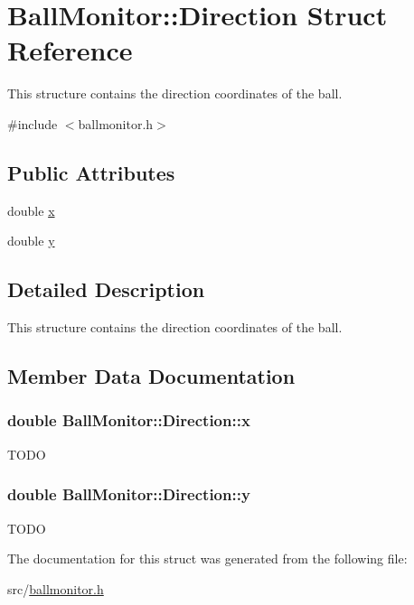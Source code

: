 \hypertarget{structBallMonitor_1_1Direction}{
\section{BallMonitor::Direction Struct Reference}
\label{structBallMonitor_1_1Direction}
}


This structure contains the direction coordinates of the ball.  




{\ttfamily \#include $<$ballmonitor.h$>$}

\subsection*{Public Attributes}
\begin{DoxyCompactItemize}
\item 
double \hyperlink{structBallMonitor_1_1Direction_aa0bde9b600685b464f05bf098857e4ce}{x}
\item 
double \hyperlink{structBallMonitor_1_1Direction_a1228146c1a63d672e59b1e5df760bf68}{y}
\end{DoxyCompactItemize}


\subsection{Detailed Description}
This structure contains the direction coordinates of the ball. 

\subsection{Member Data Documentation}
\hypertarget{structBallMonitor_1_1Direction_aa0bde9b600685b464f05bf098857e4ce}{
\subsubsection[{x}]{\setlength{\rightskip}{0pt plus 5cm}double {\bf BallMonitor::Direction::x}}}
\label{structBallMonitor_1_1Direction_aa0bde9b600685b464f05bf098857e4ce}
TODO \hypertarget{structBallMonitor_1_1Direction_a1228146c1a63d672e59b1e5df760bf68}{
\subsubsection[{y}]{\setlength{\rightskip}{0pt plus 5cm}double {\bf BallMonitor::Direction::y}}}
\label{structBallMonitor_1_1Direction_a1228146c1a63d672e59b1e5df760bf68}
TODO 

The documentation for this struct was generated from the following file:\begin{DoxyCompactItemize}
\item 
src/\hyperlink{ballmonitor_8h}{ballmonitor.h}\end{DoxyCompactItemize}
